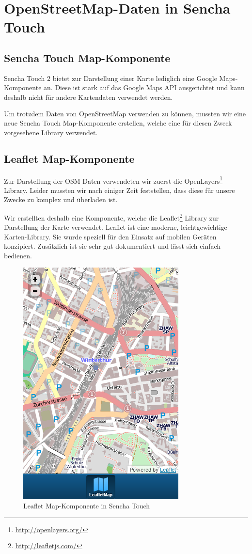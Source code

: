 \chapter{OpenStreetMap-Daten in Sencha Touch}
\label{leaflet-sencha-komponente}

\section{Sencha Touch Map-Komponente}

Sencha Touch 2 bietet zur Darstellung einer Karte lediglich eine Google Maps-Komponente an.
Diese ist stark auf das Google Maps API ausgerichtet und kann deshalb nicht für andere Kartendaten verwendet werden.

Um trotzdem Daten von \gls{OpenStreetMap} verwenden zu können, mussten wir eine neue Sencha Touch Map-Komponente erstellen, welche eine für diesen Zweck vorgesehene Library verwendet.

\section{Leaflet Map-Komponente}

Zur Darstellung der OSM-Daten verwendeten wir zuerst die OpenLayers\footnote{\url{http://openlayers.org/}} Library.
Leider mussten wir nach einiger Zeit feststellen, dass diese für unsere Zwecke zu komplex und überladen ist.

Wir erstellten deshalb eine Komponente, welche die Leaflet\footnote{\url{http://leafletjs.com/}} Library zur Darstellung der Karte verwendet.
Leaflet ist eine moderne, leichtgewichtige Karten-Library.
Sie wurde speziell für den Einsatz auf mobilen Geräten konzipiert.
Zusätzlich ist sie sehr gut dokumentiert und lässt sich einfach bedienen.

\begin{figure}[H]
	\centering
	\includegraphics[scale=0.5]{images/implementation/frontend/leafletmap-screenshot}
	\caption{Leaflet Map-Komponente in Sencha Touch}
	\label{image-leafletmap-screenshot}
\end{figure}

